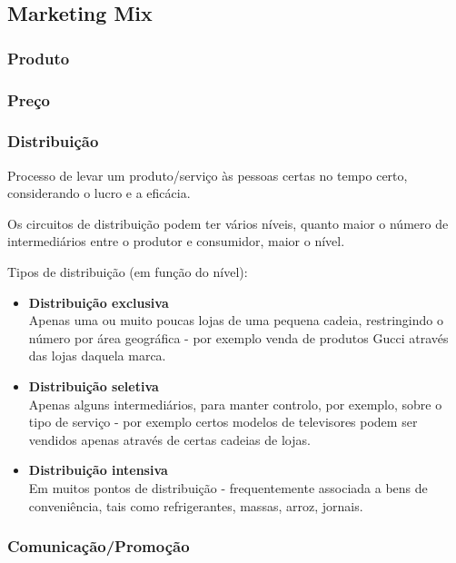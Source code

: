 \documentclass[11pt]{article}
\begin{document}
\subsection{Marketing Mix}

\subsubsection{Produto}

\subsubsection{Preço}



\subsubsection{Distribuição}

Processo de levar um produto/serviço às pessoas certas no tempo certo, considerando o lucro e a eficácia.

Os circuitos de distribuição podem ter vários níveis, quanto maior o número de intermediários entre o produtor e consumidor, maior o nível.

Tipos de distribuição (em função do nível):
\begin{itemize}[topsep=0pt]
    \item \textbf{Distribuição exclusiva} \\
          Apenas uma ou muito poucas lojas de uma pequena cadeia, restringindo o número por área geográfica - por exemplo venda de produtos Gucci através das lojas daquela marca.
    \item \textbf{Distribuição seletiva} \\
          Apenas alguns intermediários, para manter controlo, por exemplo, sobre o tipo de serviço - por exemplo certos modelos de televisores podem ser vendidos apenas através de certas cadeias de lojas.
    \item \textbf{Distribuição intensiva} \\
          Em muitos pontos de distribuição - frequentemente associada a bens de conveniência, tais como refrigerantes, massas, arroz, jornais.
\end{itemize}

\subsubsection{Comunicação/Promoção}
\end{document}
